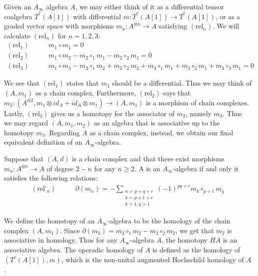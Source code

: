 \documentclass[../thesis.tex]{subfiles}
\begin{document}
        Given an $A_\infty$ algebra $A$, we may either think of it as a differential tensor coalgebra $\overline{T}^c(A[1])$ with differential $m: \overline{T}^c(A[1])\rightarrow \overline{T}^c(A[1])$, or as a graded vector space with morphisms $m_n: A^{\otimes n} \rightarrow A$ satisfying $(\text{rel}_n)$. We will calculate $(\text{rel}_n)$ for $n=1,2,3$:
        \begin{align*}
            (\text{rel}_1)\qquad & m_1\circ m_1 = 0 \\
            (\text{rel}_2)\qquad & m_1\circ m_2 - m_2\circ_{1}m_1 - m_2\circ_2m_1 = 0 \\
            (\text{rel}_3)\qquad & m_1\circ m_3 - m_2\circ_1 m_2 + m_2\circ_2m_2 + m_3\circ_1m_1 + m_3\circ_2m_1 + m_3\circ_3m_1 = 0 
        \end{align*}

        We see that $(\text{rel}_1)$ states that $m_1$ should be a differential. Thus we may think of $(A, m_1)$ as a chain complex. Furthermore, $(\text{rel}_2)$ says that $m_2 : (A^{\otimes 2}, m_1\otimes id_A + id_A\otimes m_1) \rightarrow (A, m_1)$ is a morphism of chain complexes. Lastly, $(\text{rel}_3)$ gives us a homotopy for the associator of $m_2$, namely $m_3$. Thus we may regard $(A, m_1, m_2)$ as an algebra that is associative up to the homotopy $m_3$. Regarding $A$ as a chain complex, instead, we obtain our final equivalent definition of an $A_\infty$-algebra.

        \begin{proposition}
            Suppose that $(A, d)$ is a chain complex and that there exist morphisms $m_n: A^{\otimes n} \rightarrow A$ of degree $2-n$ for any $n\geq 2$. A is an $A_\infty$-algebra if and only it satisfies the following relations:
            \begin{align*}
                (\text{rel'}_n)\qquad & \partial(m_n) = -\sum_{\substack{n = p + q + r \\ k = p + 1 + r \\ k > 1, q > 1}}(-1)^{pq + r}m_k\circ_{p+1}m_q
            \end{align*}
        \end{proposition}

        We define the homotopy of an $A_\infty$-algebra to be the homology of the chain complex $(A, m_1)$. Since $\partial(m_3) = m_2\circ_1m_2 - m_2\circ_2m_2$, we get that $m_2$ is associative in homology. Thus for any $A_\infty$-algebra $A$, the homotopy $HA$ is an associative algebra. The operadic homology of $A$ is defined as the homology of $(T^c(A[1]), m)$, which is the non-unital augmented Hochschild homology of $A$.
\end{document}
